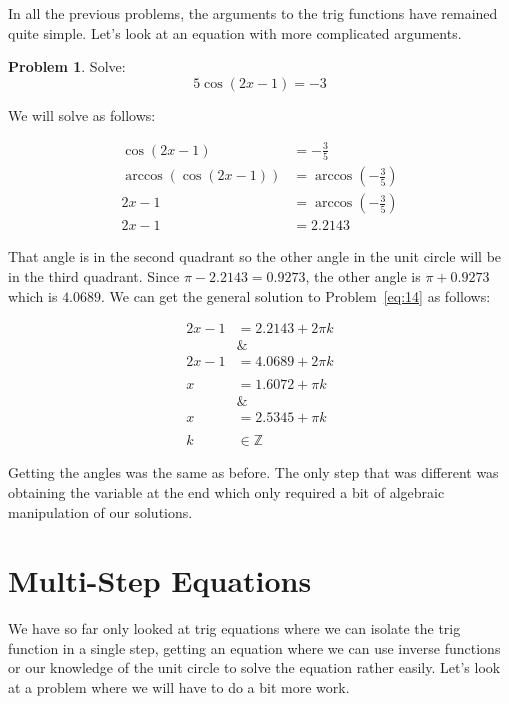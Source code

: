 \documentclass[12pt]{article}
\theoremstyle{definition}
\newtheorem{problem}{Problem}
\begin{document}
In all the previous problems, the arguments to the trig functions have remained quite simple.
Let's look at an equation with more complicated arguments.

\begin{problem}
Solve:
\begin{equation*}
    5\cos(2x-1) = -3 \label{eq:14}
\end{equation*}
\end{problem}

We will solve as follows:

\begin{align}
    \cos(2x-1)          & = -\frac{3}{5}                     \\
    \arccos(\cos(2x-1)) & = \arccos\left(-\frac{3}{5}\right) \\
    2x-1                & = \arccos\left(-\frac{3}{5}\right) \\
    2x-1                & = 2.2143
\end{align}

That angle is in the second quadrant so the other angle in the unit circle will be in the third quadrant.
Since $\pi-2.2143=0.9273$, the other angle is $\pi+0.9273$ which is $4.0689$.
We can get the general solution to Problem~\eqref{eq:14} as follows:

\begin{align}
    2x-1      & = 2.2143 + 2\pi k \\
    \nonumber & \&                \\
    2x-1      & = 4.0689 + 2\pi k \\
    \nonumber                     \\
    x         & = 1.6072 + \pi k  \\
    \nonumber & \&                \\
    x         & = 2.5345 + \pi k  \\
    \nonumber                     \\
    k         & \in \mathbb{Z}
\end{align}

Getting the angles was the same as before.
The only step that was different was obtaining the variable at the end which only required a bit of algebraic manipulation of our solutions.

\section{Multi-Step Equations}
We have so far only looked at trig equations where we can isolate the trig function in a single step, getting an equation where we can use inverse functions or our knowledge of the unit circle to solve the equation rather easily.
Let's look at a problem where we will have to do a bit more work.
\end{document}
